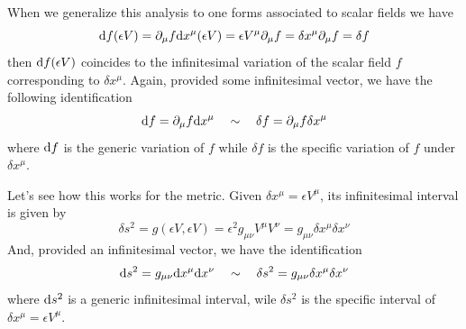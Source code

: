 \documentclass[../main/main.tex]{subfiles}
\begin{document}
When we generalize this analysis to one forms associated to scalar fields we have
\[\de f(\epsilon V)=\partial_\mu f\de x^\mu(\epsilon V)=\epsilon V^\mu\partial_\mu f=\delta x^\mu\partial_\mu f=\delta f\]
then $\de f(\epsilon V)$ coincides to the infinitesimal variation of the scalar field $f$ corresponding to $\delta x^\mu$. Again, provided some infinitesimal vector, we have the following identification
\[\textup{d} f=\partial_\mu f\textup{d} x^\mu\quad\sim\quad\delta f=\partial_\mu f\delta x^\mu\]
where $\textup{d} f$ is the generic variation of $f$ while $\delta f$ is the specific variation of $f$ under $\delta x^\mu$.
 
 Let's see how this works for the metric. Given $\delta x^\mu=\epsilon V^\mu$, its infinitesimal interval is given by 
\[\delta s^2=g(\epsilon V,\epsilon V)=\epsilon ^2g_{\mu\nu}V^\mu V^\nu=g_{\mu\nu}\delta x^\mu\delta x^\nu\]
And, provided an infinitesimal vector, we have the identification
\[\textup{d} s^2=g_{\mu\nu}\textup{d} x^\mu\textup{d} x^\nu\quad\sim\quad\delta s^2=g_{\mu\nu}\delta x^\mu\delta x^\nu\]
where $\textup{d} s^2$ is a generic infinitesimal interval, wile $\delta s^2$ is the specific interval of $\delta x^\mu=\epsilon V^\mu$.\\
\end{document}
